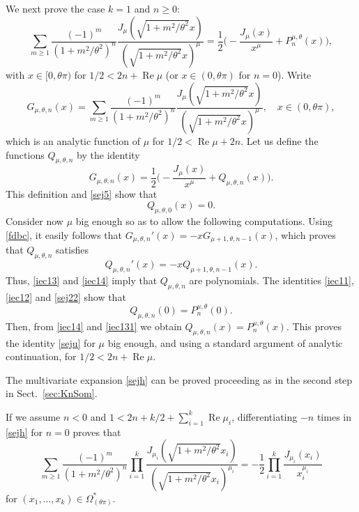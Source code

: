 \documentclass[12pt,leqno]{amsart}
\numberwithin{equation}{section}
\theoremstyle{plain}
\renewcommand{\Re}{\operatorname{Re}}
\begin{document}
We next prove the case $k=1$ and $n\ge 0$:
\begin{equation}
\label{seju}
\sum_{m\ge 1} \frac{(-1)^m}{(1+m^2/\theta ^2)^{n}}
\frac{J_{\mu}(\sqrt{1+m^2/\theta ^2}x)}
{(\sqrt{1+m^2/\theta ^2}x)^{\mu}}
= \frac{1}{2} \bigg({-}\frac{J_\mu( x)}{x^\mu}+P^{\mu,\theta}_n(x)\bigg),
\end{equation}
with $x\in[0,\theta \pi )$ for $1/2< 2n+\Re \mu$ (or $x \in (0,\theta \pi)$ for $n=0$).
Write
\begin{equation}
\label{iec11}
G_{\mu,\theta,n}(x) = \sum_{m\ge 1} \frac{(-1)^m}{(1+m^2/\theta ^2)^{n}}
\frac{J_{\mu}(\sqrt{1+m^2/\theta ^2}x)}
{(\sqrt{1+m^2/\theta ^2}x)^{\mu}},\quad x\in (0,\theta \pi),
\end{equation}
which is an analytic function of $\mu$ for $1/2< \Re \mu+2n$. Let us define the functions $Q_{\mu,\theta,n}$ by the identity
\begin{equation}
\label{iec12}
G_{\mu,\theta,n}(x) = \frac{1}{2} \bigg({-}\frac{J_\mu( x)}{ x^\mu}+Q_{\mu,\theta,n}(x)\bigg).
\end{equation}
This definition and \eqref{sej5} show that
\begin{equation}
\label{iec13}
Q_{\mu,\theta,0}(x)=0.
\end{equation}
Consider now $\mu$ big enough so as to allow the following computations. Using \eqref{fdbc}, it easily follows that
$G_{\mu,\theta,n}'(x)=-xG_{\mu+1,\theta,n-1}(x)$, which proves that $Q_{\mu,\theta,n}$ satisfies
\begin{equation}
\label{iec14}
Q_{\mu,\theta,n}'(x)=-xQ_{\mu+1,\theta,n-1}(x).
\end{equation}
Thus, \eqref{iec13} and \eqref{iec14} imply that $Q_{\mu,\theta,n}$ are polynomials.
The identities \eqref{iec11}, \eqref{iec12} and \eqref{sej22} show that
\begin{equation}
\label{iec131}
Q_{\mu,\theta,n}(0) = P^{\mu,\theta}_n(0).
\end{equation}
Then, from \eqref{iec14} and \eqref{iec131} we obtain $Q_{\mu,\theta,n}(x)=P_n^{\mu,\theta}(x)$. This proves the identity \eqref{seju} for $\mu$ big enough, and using a standard argument of analytic continuation, for $1/2< 2n+\Re \mu$.

The multivariate expansion \eqref{sejh} can be proved proceeding as in the second step in Sect.~\ref{sec:KnSom}.

If we assume $n<0$ and $1<2n+k/2+ \sum_{i=1}^k\Re \mu_i$, differentiating $-n$ times in \eqref{sejh} for $n=0$ proves that
\[
\sum_{m\ge 1} \frac{(-1)^m}{(1+m^2/\theta ^2)^{n}}
\prod_{i=1}^k \frac{J_{\mu_i}(\sqrt{1+m^2/\theta ^2}x_i)}
{(\sqrt{1+m^2/\theta ^2}x_i)^{\mu_i}}
= -\frac{1}{2}\prod_{i=1}^k\frac{J_{\mu_i}(x_i)}{x_i^{\mu_i}}
\]
for
$(x_1,\dots, x_k)\in\Omega_{(\theta \pi)}^*$.
\end{document}
